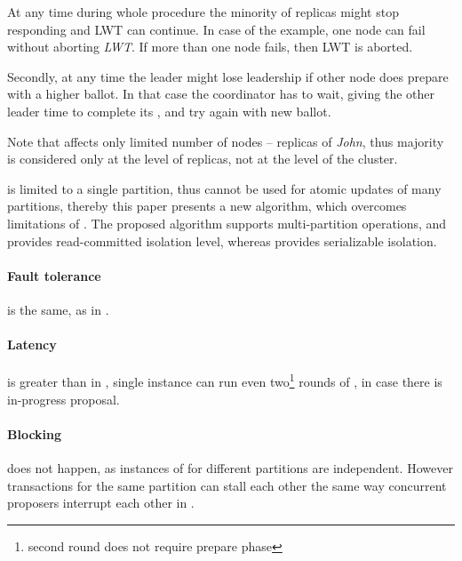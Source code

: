 At any time during whole procedure the minority of replicas might stop responding and LWT can continue. In case of the example, one node can fail without aborting \emph{LWT}. If more than one node fails, then LWT is aborted. 

Secondly, at any time the leader might lose leadership if other node does prepare with a higher ballot. In that case the coordinator has to wait, giving the other leader time to complete its \lwt, and try again with new ballot.

Note that \lwt affects only limited number of nodes -- replicas of \emph{John}, thus majority is considered only at the level of replicas, not at the level of the cluster.

\lwt is limited to a single partition, thus \lwt cannot be used for atomic updates of many partitions, thereby this paper presents a new algorithm, which overcomes limitations of \lwt.
The proposed algorithm supports multi-partition operations, and provides read-committed isolation level, whereas \lwt provides serializable isolation.

\paragraph{Fault tolerance} is the same, as in \paxos.

\paragraph{Latency} is greater than in \paxos, single \lwt instance can run even two\footnote{second round does not require prepare phase} rounds of \paxos, in case there is in-progress proposal.

\paragraph{Blocking} does not happen, as instances of \lwt for different partitions are independent. However \lwt transactions for the same partition can stall each other the same way concurrent proposers interrupt each other in \paxos.

